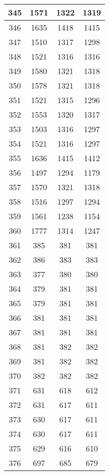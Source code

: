 \begin{table}[H]
\begin{tabular}{|c|c|c|c|}
\hline
345 & 1571 & 1322 & 1319 \\
\hline
346 & 1635 & 1418 & 1415 \\
\hline
347 & 1510 & 1317 & 1298 \\
\hline
348 & 1521 & 1316 & 1316 \\
\hline
349 & 1580 & 1321 & 1318 \\
\hline
350 & 1578 & 1321 & 1318 \\
\hline
351 & 1521 & 1315 & 1296 \\
\hline
352 & 1553 & 1320 & 1317 \\
\hline
353 & 1503 & 1316 & 1297 \\
\hline
354 & 1521 & 1316 & 1297 \\
\hline
355 & 1636 & 1415 & 1412 \\
\hline
356 & 1497 & 1294 & 1179 \\
\hline
357 & 1570 & 1321 & 1318 \\
\hline
358 & 1516 & 1297 & 1294 \\
\hline
359 & 1561 & 1238 & 1154 \\
\hline
360 & 1777 & 1314 & 1247 \\
\hline
361 & 385 & 381 & 381 \\
\hline
362 & 386 & 383 & 383 \\
\hline
363 & 377 & 380 & 380 \\
\hline
364 & 379 & 381 & 381 \\
\hline
365 & 379 & 381 & 381 \\
\hline
366 & 381 & 381 & 381 \\
\hline
367 & 381 & 381 & 381 \\
\hline
368 & 381 & 382 & 382 \\
\hline
369 & 381 & 382 & 382 \\
\hline
370 & 382 & 382 & 382 \\
\hline
371 & 631 & 618 & 612 \\
\hline
372 & 631 & 617 & 611 \\
\hline
373 & 630 & 617 & 611 \\
\hline
374 & 630 & 617 & 611 \\
\hline
375 & 629 & 616 & 610 \\
\hline
376 & 697 & 685 & 679 \\
\hline
\end{tabular}
\end{table}
